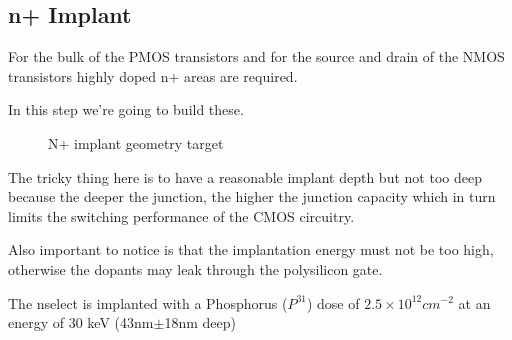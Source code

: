 \subsection{n+ Implant}\label{nimplant_chapter}

For the bulk of the PMOS transistors and for the source and drain of the NMOS transistors highly doped  n+ areas are required.

In this step we're going to build these.

\begin{figure}[H]
	\centering
	\begin{tikzpicture}[node distance = 3cm, auto, thick,scale=\CrossAndTopSectionBig, every node/.style={transform shape}]
		
	\end{tikzpicture}
	\caption{N+ implant geometry target}
\end{figure}

The tricky thing here is to have a reasonable implant depth but not too deep because the deeper the junction, the higher the junction capacity which in turn limits the switching performance of the CMOS circuitry.

Also important to notice is that the implantation energy must not be too high, otherwise the dopants may leak through the polysilicon gate.

The nselect is implanted with a Phosphorus ($P^{31}$) dose of $2.5\times10^{12}cm^{-2}$ at an energy of 30 keV (43nm$\pm$18nm deep)
